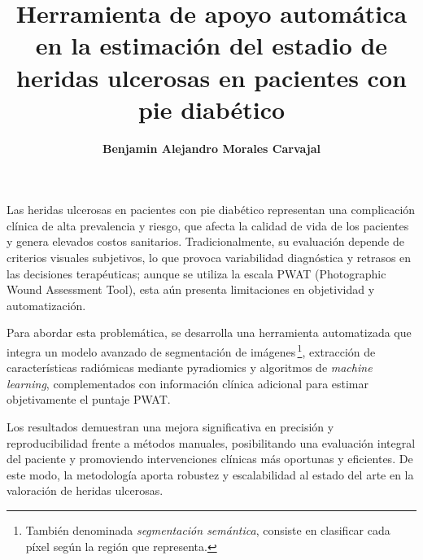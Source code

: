 \documentclass[12pt,letterpaper]{report}
\begin{document}
\title{\textbf{Herramienta de apoyo automática en la estimación del estadio de heridas ulcerosas en pacientes con pie diabético}}
\author{\textbf{Benjamin Alejandro Morales Carvajal}}


\beforepreface
{}

Las heridas ulcerosas en pacientes con pie diabético representan una complicación clínica de alta prevalencia y riesgo, que afecta la calidad de vida de los pacientes y genera elevados costos sanitarios. Tradicionalmente, su evaluación depende de criterios visuales subjetivos, lo que provoca variabilidad diagnóstica y retrasos en las decisiones terapéuticas; aunque se utiliza la escala PWAT (Photographic Wound Assessment Tool), esta aún presenta limitaciones en objetividad y automatización.

Para abordar esta problemática, se desarrolla una herramienta automatizada que integra un modelo avanzado de segmentación de imágenes\,\footnote{También denominada \emph{segmentación semántica}, consiste en clasificar cada píxel según la región que representa.}, extracción de características radiómicas mediante pyradiomics y algoritmos de \textit{machine learning}, complementados con información clínica adicional para estimar objetivamente el puntaje PWAT.

Los resultados demuestran una mejora significativa en precisión y reproducibilidad frente a métodos manuales, posibilitando una evaluación integral del paciente y promoviendo intervenciones clínicas más oportunas y eficientes. De este modo, la metodología aporta robustez y escalabilidad al estado del arte en la valoración de heridas ulcerosas.
\end{document}
